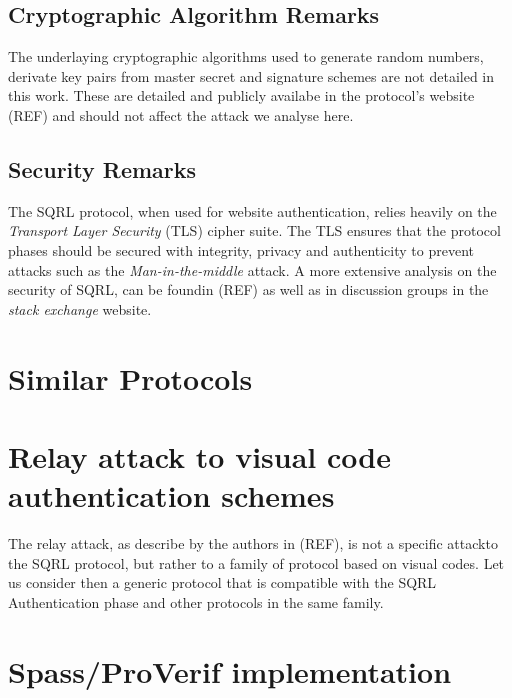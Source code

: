 \documentclass{article}
\begin{document}
	

\subsection{Cryptographic Algorithm Remarks}
	The underlaying cryptographic algorithms used to generate random numbers, derivate
	key pairs from master secret and signature schemes are not detailed in this work.
	These are detailed and publicly availabe in the protocol's website (REF) and should not
	affect the attack we analyse here. 

\subsection{Security Remarks}
	The SQRL protocol, when used for website authentication, relies heavily on
	the \emph{Transport Layer Security} (TLS) cipher suite. The TLS ensures that
	the protocol phases should be secured with integrity, privacy and authenticity
	to prevent attacks such as the \emph{Man-in-the-middle} attack. A more extensive 
	analysis on the security of SQRL, can be foundin (REF) as well as in discussion 
	groups in the \emph{stack exchange} website.

\section{Similar Protocols}

\section[Relay attack to visual code authentication schemes]{Relay attack to visual code \\
authentication schemes}
	The relay attack, as describe by the authors in (REF), is not a specific
	attackto the SQRL protocol, but rather to a family of protocol based on
	visual codes. Let us consider then a generic protocol that is compatible
	with the SQRL Authentication phase and other protocols in the same family.




\section{Spass/ProVerif implementation}
\end{document}

